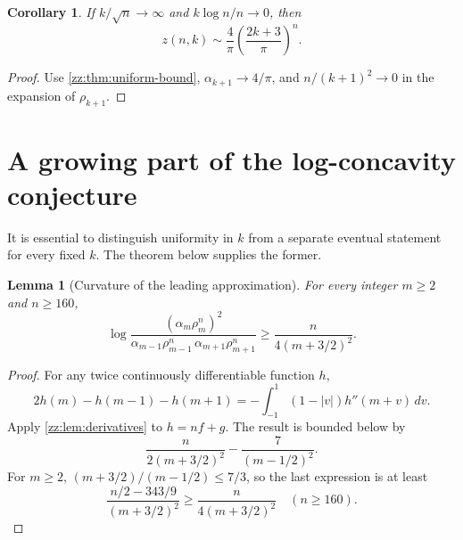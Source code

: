 \documentclass[11pt,a4paper]{article}
\newtheorem{lemma}[theorem]{Lemma}
\newtheorem{corollary}[theorem]{Corollary}
\theoremstyle{definition}
\begin{document}
\begin{corollary}
\label{zz:cor:simple-asympt}
If $k/\sqrt n\to\infty$ and $k\log n/n\to0$, then
\[
 z(n,k)\sim\frac4\pi\left(\frac{2k+3}{\pi}\right)^n.
\]
\end{corollary}
\begin{proof}
Use \cref{zz:thm:uniform-bound}, $\alpha_{k+1}\to4/\pi$, and
$n/(k+1)^2\to0$ in the expansion of $\rho_{k+1}$.
\end{proof}

\section{A growing part of the log-concavity conjecture}
\label{zz:sec:logconcavity}
It is essential to distinguish uniformity in $k$ from a separate eventual
statement for every fixed $k$.  The theorem below supplies the former.

\begin{lemma}[Curvature of the leading approximation]
\label{zz:lem:leading-curvature}
For every integer $m\ge2$ and $n\ge160$,
\begin{equation}\label{zz:eq:leading-curvature}
 \log\frac{(\alpha_m\rho_m^n)^2}
 {\alpha_{m-1}\rho_{m-1}^n\,\alpha_{m+1}\rho_{m+1}^n}
 \ge\frac{n}{4(m+3/2)^2}.
\end{equation}
\end{lemma}
\begin{proof}
For any twice continuously differentiable function $h$,
\[
 2h(m)-h(m-1)-h(m+1)
 =-\int_{-1}^1(1-|v|)h''(m+v)\,dv.
\]
Apply \cref{zz:lem:derivatives} to $h=nf+g$.  The result is bounded below by
\[
 \frac{n}{2(m+3/2)^2}-\frac7{(m-1/2)^2}.
\]
For $m\ge2$, $(m+3/2)/(m-1/2)\le7/3$, so the last expression is at least
\[
 \frac{n/2-343/9}{(m+3/2)^2}\ge\frac{n}{4(m+3/2)^2}
 \quad(n\ge160).
\]
\end{proof}
\end{document}
